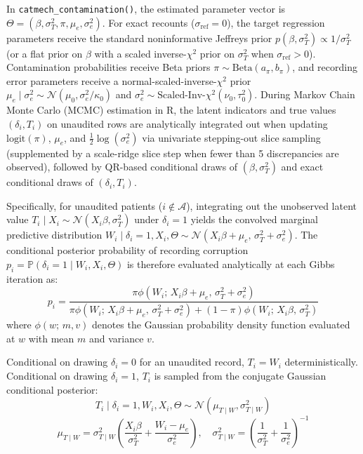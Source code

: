 \documentclass[
]{article}
\begin{document}
In \texttt{catmech\_contamination()}, the estimated parameter vector is
\(\Theta = (\beta, \sigma_T^2, \pi, \mu_e, \sigma_e^2)\). For exact
recounts (\(\sigma_{\text{ref}} = 0\)), the target regression parameters
receive the standard noninformative Jeffreys prior
\(p(\beta, \sigma_T^2) \propto 1/\sigma_T^2\) (or a flat prior on
\(\beta\) with a scaled inverse-\(\chi^2\) prior on \(\sigma_T^2\) when
\(\sigma_{\text{ref}} > 0\)). Contamination probabilities receive Beta
priors \(\pi \sim \text{Beta}(a_{\pi}, b_{\pi})\), and recording error
parameters receive a normal-scaled-inverse-\(\chi^2\) prior
\(\mu_e \mid \sigma_e^2 \sim \mathcal{N}(\mu_0, \sigma_e^2 / \kappa_0)\)
and \(\sigma_e^2 \sim \text{Scaled-Inv-}\chi^2(\nu_0, \tau_0^2)\).
During Markov Chain Monte Carlo (MCMC) estimation in R, the latent
indicators and true values \((\delta_i, T_i)\) on unaudited rows are
analytically integrated out when updating \(\text{logit}(\pi)\),
\(\mu_e\), and \(\frac{1}{2}\log(\sigma_e^2)\) via univariate
stepping-out slice sampling (supplemented by a scale-ridge slice step
when fewer than 5 discrepancies are observed), followed by QR-based
conditional draws of \((\beta, \sigma_T^2)\) and exact conditional draws
of \((\delta_i, T_i)\).

Specifically, for unaudited patients (\(i \notin \mathcal{A}\)),
integrating out the unobserved latent value
\(T_i \mid X_i \sim \mathcal{N}(X_i \beta, \sigma_T^2)\) under
\(\delta_i = 1\) yields the convolved marginal predictive distribution
\(W_i \mid \delta_i = 1, X_i, \Theta \sim \mathcal{N}(X_i \beta + \mu_e, \, \sigma_T^2 + \sigma_e^2)\).
The conditional posterior probability of recording corruption
\(p_i = \mathbb{P}(\delta_i = 1 \mid W_i, X_i, \Theta)\) is therefore
evaluated analytically at each Gibbs iteration as:
\[p_i = \frac{\pi \phi(W_i; \, X_i \beta + \mu_e, \, \sigma_T^2 + \sigma_e^2)}{\pi \phi(W_i; \, X_i \beta + \mu_e, \, \sigma_T^2 + \sigma_e^2) + (1 - \pi) \phi(W_i; \, X_i \beta, \, \sigma_T^2)}\]
where \(\phi(w; \, m, v)\) denotes the Gaussian probability density
function evaluated at \(w\) with mean \(m\) and variance \(v\).

Conditional on drawing \(\delta_i = 0\) for an unaudited record,
\(T_i = W_i\) deterministically. Conditional on drawing
\(\delta_i = 1\), \(T_i\) is sampled from the conjugate Gaussian
conditional posterior:
\[T_i \mid \delta_i = 1, W_i, X_i, \Theta \sim \mathcal{N}(\mu_{T \mid W}, \sigma_{T \mid W}^2)\]
\[\mu_{T \mid W} = \sigma_{T \mid W}^2 \left( \frac{X_i \beta}{\sigma_T^2} + \frac{W_i - \mu_e}{\sigma_e^2} \right), \quad \sigma_{T \mid W}^2 = \left( \frac{1}{\sigma_T^2} + \frac{1}{\sigma_e^2} \right)^{-1}\]
\end{document}
